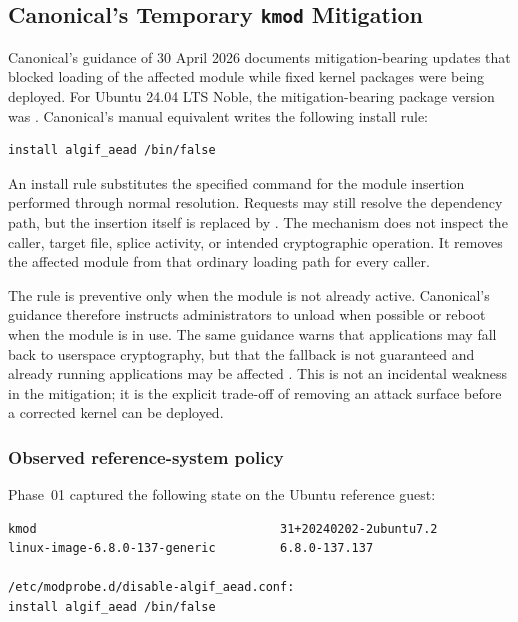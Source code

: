 \subsection{Canonical's Temporary \texttt{kmod} Mitigation}

Canonical's guidance of 30 April 2026 documents mitigation-bearing 
updates that blocked loading of the affected  module while
fixed kernel packages were being deployed. For Ubuntu 24.04 LTS Noble, the
mitigation-bearing package version was 
\cite{ubuntu-copyfail-fixes}. Canonical's manual equivalent writes the following
 install rule:

\begin{lstlisting}
install algif_aead /bin/false
\end{lstlisting}

An install rule substitutes the specified command for the module insertion
performed through normal  resolution. Requests may still resolve
the dependency path, but the  insertion itself is replaced by
. The mechanism does not inspect the caller, target file,
splice activity, or intended cryptographic operation. It removes the affected
module from that ordinary loading path for every caller.

The rule is preventive only when the module is not already active. Canonical's
guidance therefore instructs administrators to unload  when
possible or reboot when the module is in use. The same guidance warns that
applications may fall back to userspace cryptography, but that the fallback is
not guaranteed and already running applications may be affected
\cite{ubuntu-copyfail-fixes}. This is not an incidental weakness in the
mitigation; it is the explicit trade-off of removing an attack surface before a
corrected kernel can be deployed.

\subsubsection{Observed reference-system policy}

Phase~01 captured the following state on the Ubuntu reference guest:

\begin{lstlisting}
kmod                                  31+20240202-2ubuntu7.2
linux-image-6.8.0-137-generic         6.8.0-137.137

/etc/modprobe.d/disable-algif_aead.conf:
install algif_aead /bin/false
\end{lstlisting}

